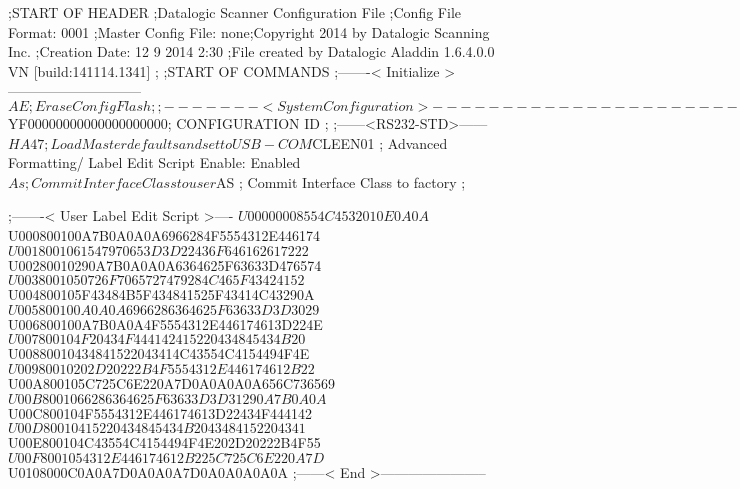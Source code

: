 ;START OF HEADER
;Datalogic Scanner Configuration File
;Config File Format: 0001
;Master Config File: none;Copyright 2014 by Datalogic Scanning Inc.
;Creation Date: 12 9 2014 2:30
;File created by Datalogic Aladdin 1.6.4.0.0 VN [build:141114.1341]
;
;START OF COMMANDS
;-------< Initialize >-----------------------------
$AE                 ; Erase Config Flash
;
;-------< System Configuration >-------------------------------
$YF00000000000000000000; CONFIGURATION ID
;
;------<RS232-STD>------
$HA47               ; Load Master defaults and set to USB-COM
$CLEEN01            ; Advanced Formatting/ Label Edit Script Enable: Enabled
$As                 ; Commit Interface Class to user
$AS                 ; Commit Interface Class to factory
;

;-------< User Label Edit Script >----
$U00000008554C4532010E0A0A
$U000800100A7B0A0A0A6966284F5554312E446174
$U0018001061547970653D3D22436F646162617222
$U00280010290A7B0A0A0A6364625F63633D476574
$U0038001050726F7065727479284C465F43424152
$U004800105F43484B5F434841525F43414C43290A
$U005800100A0A0A6966286364625F63633D3D3029
$U006800100A7B0A0A4F5554312E446174613D224E
$U007800104F20434F444142415220434845434B20
$U00880010434841522043414C43554C4154494F4E
$U00980010202D20222B4F5554312E446174612B22
$U00A800105C725C6E220A7D0A0A0A0A656C736569
$U00B8001066286364625F63633D3D31290A7B0A0A
$U00C800104F5554312E446174613D22434F444142
$U00D80010415220434845434B2043484152204341
$U00E800104C43554C4154494F4E202D20222B4F55
$U00F8001054312E446174612B225C725C6E220A7D
$U0108000C0A0A7D0A0A0A7D0A0A0A0A0A
;------< End >-----------------------
